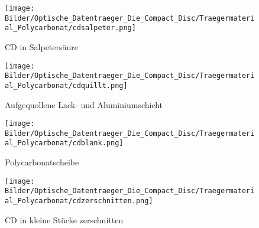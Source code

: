 \begin{figure}[h]
    \begin{center}
        \begin{minipage}[t]{0.4\textwidth}
            \begin{center}
                \texttt{[image: Bilder/Optische\_Datentraeger\_Die\_Compact\_Disc/Traegermaterial\_Polycarbonat/cdsalpeter.png]}
                \caption[CD in Salpetersäure]{CD in Salpetersäure}
                \label{fig:cdsalpeter}
            \end{center}
        \end{minipage}
        \hspace{0.025\textwidth}
        \begin{minipage}[t]{0.4\textwidth}
            \begin{center}
                \texttt{[image: Bilder/Optische\_Datentraeger\_Die\_Compact\_Disc/Traegermaterial\_Polycarbonat/cdquillt.png]}
                \caption[\qlqq Aufgequolleney\grqq{} Lack- und Aluminiumschicht]{\glqq Aufgequollene\grqq{} Lack- und Aluminiumschicht}
                \label{fig:cdquillt}
            \end{center}
        \end{minipage}
    \end{center}
\end{figure}

\begin{figure}[h]
    \begin{center}
        \begin{minipage}[t]{0.4\textwidth}
            \begin{center}
                \texttt{[image: Bilder/Optische\_Datentraeger\_Die\_Compact\_Disc/Traegermaterial\_Polycarbonat/cdblank.png]}
                \caption[Polycarbonatscheibe]{Polycarbonatscheibe}
                \label{fig:cdblank}
            \end{center}
        \end{minipage}
        \hspace{0.025\textwidth}
        \begin{minipage}[t]{0.4\textwidth}
            \begin{center}
                \texttt{[image: Bilder/Optische\_Datentraeger\_Die\_Compact\_Disc/Traegermaterial\_Polycarbonat/cdzerschnitten.png]}
                \caption[CD in kleine Stücke zerschnitten]{CD in kleine Stücke zerschnitten}
                \label{fig:cdzerschnitten}
            \end{center}
        \end{minipage}
    \end{center}
\end{figure}

